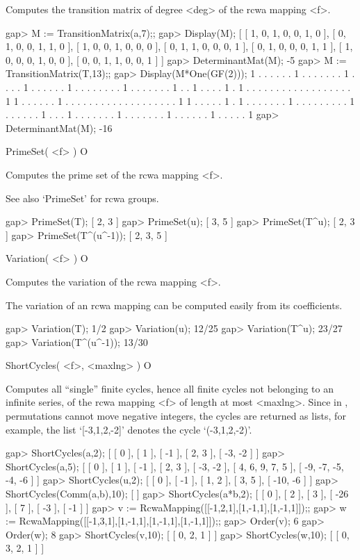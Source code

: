 Computes the transition matrix of degree <deg> of the rcwa mapping <f>.

\beginexample
gap> M := TransitionMatrix(a,7);;
gap> Display(M);
[ [  1,  0,  1,  0,  0,  1,  0 ],
  [  0,  1,  0,  0,  1,  1,  0 ],
  [  1,  0,  0,  1,  0,  0,  0 ],
  [  0,  1,  1,  0,  0,  0,  1 ],
  [  0,  1,  0,  0,  0,  1,  1 ],
  [  1,  0,  0,  0,  1,  0,  0 ],
  [  0,  0,  1,  1,  0,  0,  1 ] ]
gap> DeterminantMat(M);
-5
gap> M := TransitionMatrix(T,13);;
gap> Display(M*One(GF(2)));
 1 . . . . . . 1 . . . . .
 . . 1 . . . . 1 . . . . .
 . 1 . . . . . . . . 1 . .
 . . . . . 1 . . 1 . . . .
 1 . 1 . . . . . . . . . .
 . . . . . . . . 1 1 . . .
 . . . 1 . . . . . . . . .
 . . . . . . . . . . 1 1 .
 . . . . 1 . 1 . . . . . .
 . 1 . . . . . . . . . 1 .
 . . . . . 1 . . . 1 . . .
 . . . . 1 . . . . . . . 1
 . . . . . . 1 . . . . . 1
gap> DeterminantMat(M);
-16
\endexample

\>PrimeSet( <f> ) O

Computes the prime set of the rcwa mapping <f>.

See also `PrimeSet' for rcwa groups.

\beginexample
gap> PrimeSet(T);
[ 2, 3 ]
gap> PrimeSet(u);
[ 3, 5 ]
gap> PrimeSet(T^u);
[ 2, 3 ]
gap> PrimeSet(T^(u^-1));
[ 2, 3, 5 ]
\endexample

\>Variation( <f> ) O

Computes the variation of the rcwa mapping <f>.

The variation of an rcwa mapping can be computed easily from its
coefficients.

\beginexample
gap> Variation(T);
1/2
gap> Variation(u);
12/25
gap> Variation(T^u);
23/27
gap> Variation(T^(u^-1));
13/30
\endexample


\>ShortCycles( <f>, <maxlng> ) O

Computes all ``single'' finite cycles, hence all finite cycles not
belonging to an infinite series, of the rcwa mapping <f> of length at 
most <maxlng>.
Since in {\GAP}, permutations cannot move negative integers, the cycles
are returned as lists, for example, the list `[-3,1,2,-2]' denotes the
cycle `(-3,1,2,-2)'.

\beginexample
gap> ShortCycles(a,2);
[ [ 0 ], [ 1 ], [ -1 ], [ 2, 3 ], [ -3, -2 ] ]
gap> ShortCycles(a,5);
[ [ 0 ], [ 1 ], [ -1 ], [ 2, 3 ], [ -3, -2 ], [ 4, 6, 9, 7, 5 ], [ -9, -7, -5, -4, -6 ] ]
gap> ShortCycles(u,2);
[ [ 0 ], [ -1 ], [ 1, 2 ], [ 3, 5 ], [ -10, -6 ] ]
gap> ShortCycles(Comm(a,b),10);
[  ]
gap> ShortCycles(a*b,2);
[ [ 0 ], [ 2 ], [ 3 ], [ -26 ], [ 7 ], [ -3 ], [ -1 ] ]
gap> v := RcwaMapping([[-1,2,1],[1,-1,1],[1,-1,1]]);;
gap> w := RcwaMapping([[-1,3,1],[1,-1,1],[1,-1,1],[1,-1,1]]);;
gap> Order(v);
6
gap> Order(w);
8 
gap> ShortCycles(v,10);
[ [ 0, 2, 1 ] ]
gap> ShortCycles(w,10);
[ [ 0, 3, 2, 1 ] ]
\endexample

